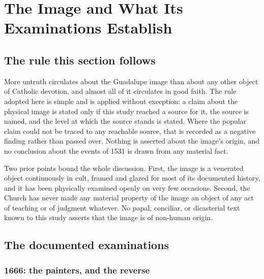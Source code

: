 \sectionguard
\section{The Image and What Its Examinations Establish}

\subsection{The rule this section follows}

More untruth circulates about the Guadalupe image than about any
other object of Catholic devotion, and almost all of it circulates in
good faith. The rule adopted here is simple and is applied without
exception: a claim about the physical image is stated only if this
study reached a source for it, the source is named, and the level at
which the source stands is stated. Where the popular claim could not
be traced to any reachable source, that is recorded as a negative
finding rather than passed over. Nothing is asserted about the
image's origin, and no conclusion about the events of 1531 is drawn
from any material fact.

Two prior points bound the whole discussion. First, the image is a
venerated object continuously in cult, framed and glazed for most of
its documented history, and it has been physically examined openly
on very few occasions. Second, the Church has never made any material
property of the image an object of any act of teaching or of judgment
whatever. No papal, conciliar, or dicasterial text known to this
study asserts that the image is of non-human origin.

\subsection{The documented examinations}

\subsubsection*{1666: the painters, and the reverse}

